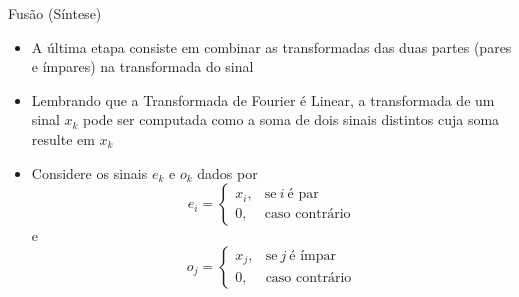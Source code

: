 \begin{frame}[fragile]{Fusão (Síntese)}

    \begin{itemize}
        \item A última etapa consiste em combinar as transformadas das duas partes (pares e
            ímpares) na transformada do sinal

        \item Lembrando que a Transformada de Fourier é Linear, a transformada de um sinal $x_k$
            pode ser computada como a soma de dois sinais distintos cuja soma resulte em $x_k$

        \item Considere os sinais $e_k$ e $o_k$ dados por
        \[
            e_i = \left\{ \begin{array}{ll}
                    x_i, &\mbox{se}\ i\ \mbox{é par}\\
                    0, &\mbox{caso contrário}
                \end{array}\right.
        \]
        e
        \[
            o_j = \left\{ \begin{array}{ll}
                    x_j, &\mbox{se}\ j\ \mbox{é ímpar}\\
                    0, &\mbox{caso contrário}
                \end{array}\right.
        \]
 
    \end{itemize}

\end{frame}

